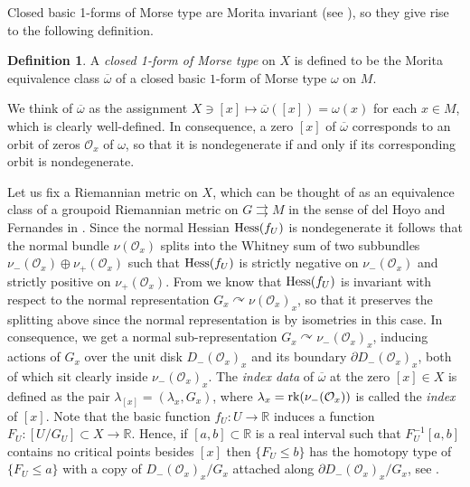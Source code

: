 \documentclass[
  a4paper, 
  reqno, 
  oneside, 
  12pt
]{amsart}
\theoremstyle{definition}
\newtheorem{definition}[theorem]{Definition}
\theoremstyle{remark}
\newcommand{\rr}{\rightrightarrows}
\begin{document}
Closed basic 1-forms of Morse type are Morita invariant (see \cite[Prop. 3.8]{V}), so they give rise to the following definition.

\begin{definition}
A \emph{closed 1-form of Morse type} on $X$ is defined to be the Morita equivalence class $\overline{\omega}$ of a closed basic $1$-form of Morse type $\omega$ on $M$.
\end{definition}

We think of $\overline{\omega}$ as the assignment $X\ni [x]\mapsto \overline{\omega}([x])=\omega(x)$ for each $ x\in M$, which is clearly well-defined. In consequence, a zero $[x]$ of $\overline{\omega}$ corresponds to an orbit of zeros $\mathcal{O}_x$ of $\omega$, so that it is nondegenerate if and only if its corresponding orbit is nondegenerate. 

Let us fix a Riemannian metric on $X$, which can be thought of as an equivalence class of a groupoid Riemannian metric on $G\rr M$ in the sense of del Hoyo and Fernandes in \cite{dHF,dHF2}. Since the normal Hessian $\textnormal{Hess}(f_U)$ is nondegenerate it follows that the normal bundle $\nu(\mathcal{O}_x)$ splits into the Whitney sum of two subbundles $\nu_-(\mathcal{O}_x)\oplus \nu_+(\mathcal{O}_x)$ such that $\textnormal{Hess}(f_U)$ is strictly negative on $\nu_-(\mathcal{O}_x)$ and strictly positive on $\nu_+(\mathcal{O}_x)$. From \cite[Lem. 5.4]{OV} we know that $\textnormal{Hess}(f_U)$ is invariant with respect to the normal representation $G_x\curvearrowright \nu(\mathcal{O}_x)_x$, so that it preserves the splitting above since the normal representation is by isometries in this case. In consequence, we get a normal sub-representation $G_x\curvearrowright \nu_-(\mathcal{O}_x)_x$, inducing actions of $G_x$ over the unit disk $D_-(\mathcal{O}_x)_x$ and its boundary $\partial D_-(\mathcal{O}_x)_x$, both of which sit clearly inside $\nu_-(\mathcal{O}_x)_x$. The \emph{index data} of $\overline{\omega}$ at the zero $[x]\in X$ is defined as the pair $\lambda_{[x]}=(\lambda_x,G_x)$, where $\lambda_x=\textnormal{rk}(\nu_-(\mathcal{O}_x))$ is called the \emph{index} of $[x]$. Note that the basic function $f_U:U\to \mathbb{R}$ induces a function $F_U:[U/G_U]\subset X\to \mathbb{R}$. Hence, if $[a,b]\subset \mathbb{R}$ is a real interval such that $F_U^{-1}[a,b]$ contains no critical points besides $[x]$ then $\lbrace F_U\leq b\rbrace$ has the homotopy type of $\lbrace F_U\leq a\rbrace$ with a copy of $D_-(\mathcal{O}_x)_x/G_x$ attached along $\partial D_-(\mathcal{O}_x)_x/G_x$, see \cite{Hep,OV}. 
\end{document}
